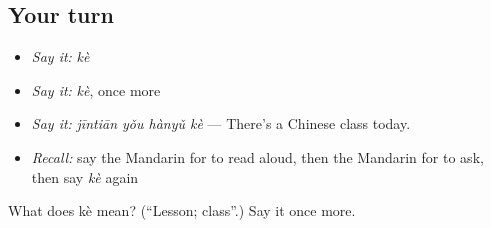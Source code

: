 \subsection*{Your turn}
\begin{itemize}
\raggedright
  \item \emph{Say it:} \emph{kè}
  \item \emph{Say it:} \emph{kè}, once more
  \item \emph{Say it:} \emph{jīntiān yǒu hànyǔ kè} — There's a Chinese class today.
  \item \emph{Recall:} say the Mandarin for to read aloud, then the Mandarin for to ask, then say \emph{kè} again
\end{itemize}

\begin{tcolorbox}[breakable,colback=teal!4,colframe=teal!35!black,title={Before you move on}]
What does kè mean? (\textquotedblleft{}Lesson; class\textquotedblright{}.) Say it once more.
\end{tcolorbox}
